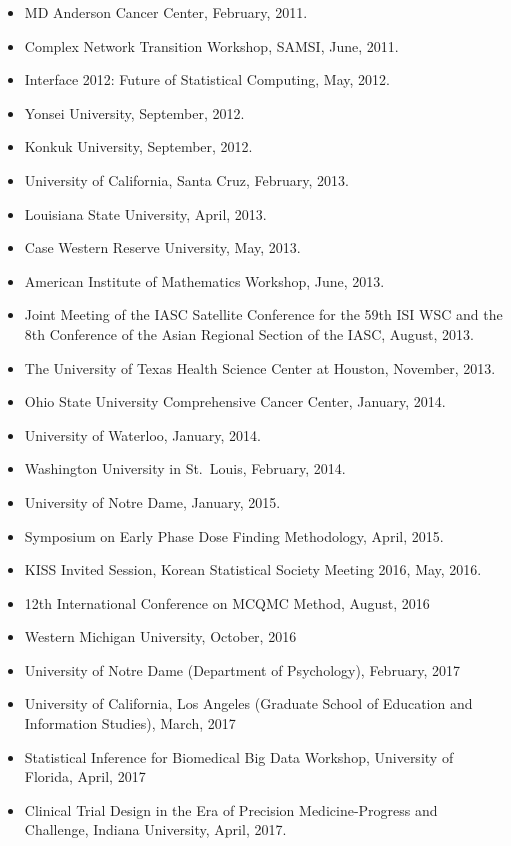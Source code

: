 \documentclass[
]{book}
\providecommand{\tightlist}{%
  \setlength{\itemsep}{0pt}\setlength{\parskip}{0pt}}
\begin{document}
\begin{itemize}
\tightlist
\item
  MD Anderson Cancer Center, February, 2011.
\item
  Complex Network Transition Workshop, SAMSI, June, 2011.
\item
  Interface 2012: Future of Statistical Computing, May, 2012.
\item
  Yonsei University, September, 2012.
\item
  Konkuk University, September, 2012.
\item
  University of California, Santa Cruz, February, 2013.
\item
  Louisiana State University, April, 2013.
\item
  Case Western Reserve University, May, 2013.
\item
  American Institute of Mathematics Workshop, June, 2013.
\item
  Joint Meeting of the IASC Satellite Conference for the 59th ISI WSC and the 8th Conference of the Asian Regional Section of the IASC, August, 2013.
\item
  The University of Texas Health Science Center at Houston, November, 2013.
\item
  Ohio State University Comprehensive Cancer Center, January, 2014.
\item
  University of Waterloo, January, 2014.
\item
  Washington University in St.~Louis, February, 2014.
\item
  University of Notre Dame, January, 2015.
\item
  Symposium on Early Phase Dose Finding Methodology, April, 2015.
\item
  KISS Invited Session, Korean Statistical Society Meeting 2016, May, 2016.
\item
  12th International Conference on MCQMC Method, August, 2016
\item
  Western Michigan University, October, 2016
\item
  University of Notre Dame (Department of Psychology), February, 2017
\item
  University of California, Los Angeles (Graduate School of Education and Information Studies), March, 2017
\item
  Statistical Inference for Biomedical Big Data Workshop, University of Florida, April, 2017
\item
  Clinical Trial Design in the Era of Precision Medicine-Progress and Challenge, Indiana University, April, 2017.

\end{itemize}
\end{document}
